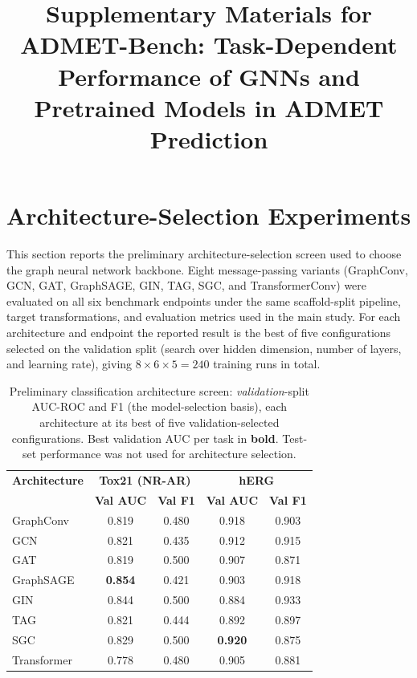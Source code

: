 \documentclass[journal,onecolumn]{IEEEtran}
\begin{document}
\title{Supplementary Materials for\\
ADMET-Bench: Task-Dependent Performance of GNNs and Pretrained Models in ADMET Prediction}

\author{}

\maketitle

\renewcommand{\thetable}{S\arabic{table}}
\renewcommand{\thefigure}{S\arabic{figure}}

\section{Architecture-Selection Experiments}
\label{sec:supp_architecture}

This section reports the preliminary architecture-selection screen used to choose the graph neural network backbone. Eight message-passing variants (GraphConv, GCN, GAT, GraphSAGE, GIN, TAG, SGC, and TransformerConv) were evaluated on all six benchmark endpoints under the same scaffold-split pipeline, target transformations, and evaluation metrics used in the main study. For each architecture and endpoint the reported result is the best of five configurations selected on the validation split (search over hidden dimension, number of layers, and learning rate), giving $8 \times 6 \times 5 = 240$ training runs in total.

\begin{table}[H]
\centering
\caption{Preliminary classification architecture screen: \emph{validation}-split AUC-ROC and F1 (the model-selection basis), each architecture at its best of five validation-selected configurations. Best validation AUC per task in \textbf{bold}. Test-set performance was not used for architecture selection.}
\label{tab:arch_classification}
\small
\setlength{\tabcolsep}{4pt}
\begin{tabular}{lcccc}
\toprule
\textbf{Architecture} & \multicolumn{2}{c}{\textbf{Tox21 (NR-AR)}} & \multicolumn{2}{c}{\textbf{hERG}} \\
 & \textbf{Val AUC} & \textbf{Val F1} & \textbf{Val AUC} & \textbf{Val F1} \\
\midrule
GraphConv & 0.819 & 0.480 & 0.918 & 0.903 \\
GCN & 0.821 & 0.435 & 0.912 & 0.915 \\
GAT & 0.819 & 0.500 & 0.907 & 0.871 \\
GraphSAGE & \textbf{0.854} & 0.421 & 0.903 & 0.918 \\
GIN & 0.844 & 0.500 & 0.884 & 0.933 \\
TAG & 0.821 & 0.444 & 0.892 & 0.897 \\
SGC & 0.829 & 0.500 & \textbf{0.920} & 0.875 \\
Transformer & 0.778 & 0.480 & 0.905 & 0.881 \\
\bottomrule
\end{tabular}
\end{table}
\end{document}

